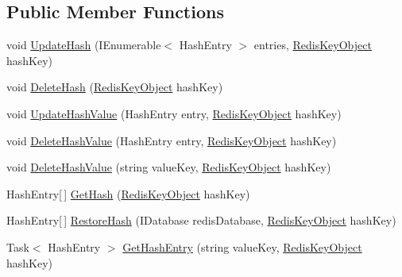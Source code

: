 \subsection*{Public Member Functions}
\begin{DoxyCompactItemize}
\item 
void \hyperlink{interface_demgel_redis_1_1_interfaces_1_1_i_redis_backup_a8de95df7ab4cb996be4fe6d46df9156b}{Update\+Hash} (I\+Enumerable$<$ Hash\+Entry $>$ entries, \hyperlink{class_demgel_redis_1_1_common_1_1_redis_key_object}{Redis\+Key\+Object} hash\+Key)
\item 
void \hyperlink{interface_demgel_redis_1_1_interfaces_1_1_i_redis_backup_a4bc3af3e7bd7d1a28f38230d2030a864}{Delete\+Hash} (\hyperlink{class_demgel_redis_1_1_common_1_1_redis_key_object}{Redis\+Key\+Object} hash\+Key)
\item 
void \hyperlink{interface_demgel_redis_1_1_interfaces_1_1_i_redis_backup_ad3f3a8fd6bcbaea1e2223b0bfd82f86c}{Update\+Hash\+Value} (Hash\+Entry entry, \hyperlink{class_demgel_redis_1_1_common_1_1_redis_key_object}{Redis\+Key\+Object} hash\+Key)
\item 
void \hyperlink{interface_demgel_redis_1_1_interfaces_1_1_i_redis_backup_a5cd539983c598e26976560d893412f1f}{Delete\+Hash\+Value} (Hash\+Entry entry, \hyperlink{class_demgel_redis_1_1_common_1_1_redis_key_object}{Redis\+Key\+Object} hash\+Key)
\item 
void \hyperlink{interface_demgel_redis_1_1_interfaces_1_1_i_redis_backup_a2e8413f622a80e29a22fe51facd3f916}{Delete\+Hash\+Value} (string value\+Key, \hyperlink{class_demgel_redis_1_1_common_1_1_redis_key_object}{Redis\+Key\+Object} hash\+Key)
\item 
Hash\+Entry\mbox{[}$\,$\mbox{]} \hyperlink{interface_demgel_redis_1_1_interfaces_1_1_i_redis_backup_a768b6feccaf35fc2d25a370685d7762a}{Get\+Hash} (\hyperlink{class_demgel_redis_1_1_common_1_1_redis_key_object}{Redis\+Key\+Object} hash\+Key)
\item 
Hash\+Entry\mbox{[}$\,$\mbox{]} \hyperlink{interface_demgel_redis_1_1_interfaces_1_1_i_redis_backup_aa0a6644c11ee64b23000d0264142612a}{Restore\+Hash} (I\+Database redis\+Database, \hyperlink{class_demgel_redis_1_1_common_1_1_redis_key_object}{Redis\+Key\+Object} hash\+Key)
\item 
Task$<$ Hash\+Entry $>$ \hyperlink{interface_demgel_redis_1_1_interfaces_1_1_i_redis_backup_a450309b3a5885cf6e0358ffcdc6a88d3}{Get\+Hash\+Entry} (string value\+Key, \hyperlink{class_demgel_redis_1_1_common_1_1_redis_key_object}{Redis\+Key\+Object} hash\+Key)

\end{DoxyCompactItemize}
